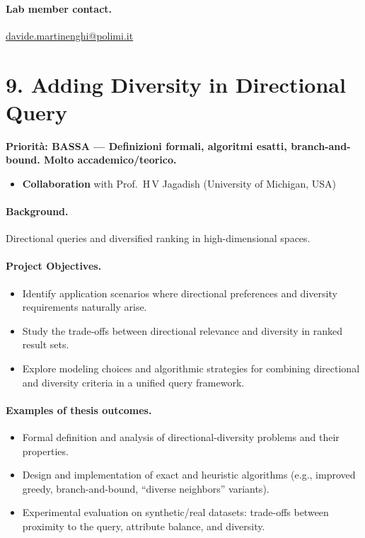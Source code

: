 \documentclass[a4paper,11pt]{article}
\newcommand{\priorita}[1]{%
  \par\smallskip\noindent\textbf{Priorit\`a: #1}\par\smallskip
}
\begin{document}
\paragraph{Lab member contact.}
\url{davide.martinenghi@polimi.it}


\section{9. Adding Diversity in Directional Query}

\priorita{BASSA --- Definizioni formali, algoritmi esatti, branch-and-bound. Molto accademico/teorico.}

\begin{itemize}[nosep]
  \item \textbf{Collaboration} with Prof.\ H\,V Jagadish (University of Michigan, USA)
\end{itemize}

\paragraph{Background.}
Directional queries and diversified ranking in high-dimensional spaces.

\paragraph{Project Objectives.}
\begin{itemize}[nosep]
  \item Identify application scenarios where directional preferences and diversity requirements naturally arise.
  \item Study the trade-offs between directional relevance and diversity in ranked result sets.
  \item Explore modeling choices and algorithmic strategies for combining directional and diversity criteria in a unified query framework.
\end{itemize}

\paragraph{Examples of thesis outcomes.}
\begin{itemize}[nosep]
  \item Formal definition and analysis of directional-diversity problems and their properties.
  \item Design and implementation of exact and heuristic algorithms (e.g., improved greedy, branch-and-bound, ``diverse neighbors'' variants).
  \item Experimental evaluation on synthetic/real datasets: trade-offs between proximity to the query, attribute balance, and diversity.
\end{itemize}
\end{document}

